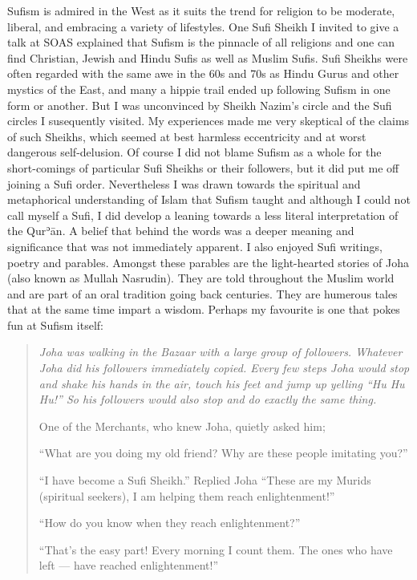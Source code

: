 \documentclass[12pt]{memoir}
\def\´{ʾ} %
\newcommand{\cmt}[2]{#1} %
\def \Quran{Qur\-\´ān} %
\begin{document}
Sufism is admired in the West as it suits the trend for religion
to be moderate, liberal, and embracing a variety of lifestyles.
One Sufi Sheikh I invited to give a talk at SOAS explained
that Sufism is the pinnacle of all religions and one can find
Christian, Jewish and Hindu Sufis as well as Muslim Sufis.
Sufi Sheikhs were often regarded with the same awe in the 60s and 70s
as Hindu Gurus and other mystics of the East,
and many a hippie trail ended up following Sufism in one form or another.
But I was unconvinced by Sheikh Nazim’s circle
and the Sufi circles I susequently visited.
My experiences made me very skeptical of the claims of such Sheikhs,
which seemed at best harmless eccentricity
and at worst dangerous self-delusion.
Of course I did not blame Sufism as a whole for the short-comings
of particular Sufi Sheikhs or their followers,
but it did put me off joining a Sufi order.
Nevertheless I was drawn towards the spiritual and metaphorical understanding
of Islam that Sufism taught and although I could not call myself a Sufi,
I did develop a leaning towards a less literal interpretation of the \Quran.
A belief that behind the words was a deeper meaning and significance
that was not immediately apparent.
I also enjoyed Sufi writings, poetry and parables.
Amongst these parables are the light-hearted stories of Joha
(also known as Mullah Nasrudin).
They are told throughout the Muslim world
and are part of an oral tradition going back centuries.
They are \cmt{humerous}{humorous} tales that at the same time impart a wisdom.
Perhaps my favourite is one that pokes fun at Sufism itself:

\begin{quote}
\itshape
Joha was walking in the Bazaar with a large group of followers.
Whatever Joha did his followers immediately copied.
Every few steps Joha would stop and shake his hands in the air,
touch his feet and jump up yelling “Hu Hu Hu!”
So his followers would also stop and do exactly the same thing.

One of the Merchants, who knew Joha, quietly asked him;

“What are you doing my old friend?
Why are these people imitating you?”

“I have become a Sufi Sheikh.”
Replied Joha “These are my Murids (spiritual seekers),
I am helping them reach enlightenment!”

“How do you know when they reach enlightenment?”

“That’s the easy part! Every morning I count them.
The ones who have left — have reached enlightenment!”
\end{quote}
\end{document}
